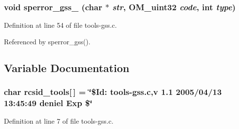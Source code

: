 \subsubsection{\setlength{\rightskip}{0pt plus 5cm}void sperror\_\-gss\_ (char $\ast$ {\em str}, OM\_\-uint32 {\em code}, int {\em type})}\label{tools-gss_8c_a22}




Definition at line 54 of file tools-gss.c.

Referenced by sperror\_\-gss().

\subsection{Variable Documentation}
\subsubsection{\setlength{\rightskip}{0pt plus 5cm}char {\bf rcsid\_\-tools}[$\,$] = \char`\"{}\$Id: tools-gss.c,v 1.1 2005/04/13 13:45:49 deniel Exp \$\char`\"{}}\label{tools-gss_8c_a21}




Definition at line 7 of file tools-gss.c.